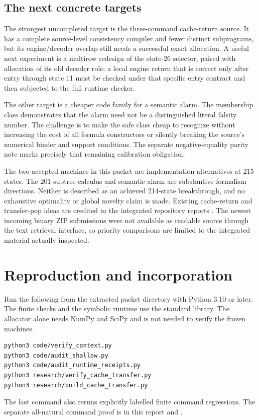 \documentclass[11pt]{article}
\theoremstyle{definition}
\begin{document}
\subsection{The next concrete targets}

The strongest uncompleted target is the three-command cache-return source.
It has a complete source-level consistency compiler and fewer distinct
subprograms, but its engine/decoder overlap still needs a successful exact
allocation. A useful next experiment is a multirow redesign of the
state-26 selector, paired with allocation of its old decoder role; a local
engine return that is correct only after entry through state 11 must be
checked under that specific entry contract and then subjected to the full
runtime checker.

The other target is a cheaper code family for a semantic alarm. The
membership class demonstrates that the alarm need not be a distinguished
literal falsity number. The challenge is to make the safe class cheap to
recognize without increasing the cost of all formula constructors or
silently breaking the source's numerical binder and support conditions.
The separate negative-equality parity note marks precisely that remaining
calibration obligation.

The two accepted machines in this packet are implementation alternatives
at 215 states. The 201-subtree calculus and semantic alarm are substantive
formalism directions. Neither is described as an achieved 214-state
breakthrough, and no exhaustive optimality or global novelty claim is
made. Existing cache-return and transfer-pop ideas are credited to the
integrated repository reports \cite{cachemp,transfer}. The newest incoming
binary ZIP submissions were not available as readable source through the
text retrieval interface, so priority comparisons are limited to the
integrated material actually inspected.

\clearpage
\section{Reproduction and incorporation}

Run the following from the extracted packet directory with Python 3.10 or
later. The finite checks and the symbolic runtime use the standard library.
The allocator alone needs NumPy and SciPy and is not needed to verify the
frozen machines.
\begin{verbatim}
python3 code/verify_context.py
python3 code/audit_shallow.py
python3 code/audit_runtime_receipts.py
python3 research/verify_cache_transfer.py
python3 research/build_cache_transfer.py
\end{verbatim}
The last command also reruns explicitly labelled finite command regressions.
The separate all-natural command proof is in this report and
.
\end{document}
